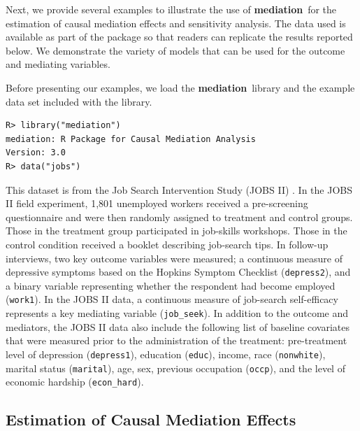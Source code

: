 \documentclass[11pt,letterpaper]{article}
\theoremstyle{plain}
\newcommand\bmediation{{\bf mediation}}
\begin{document}
Next, we provide several examples to illustrate the use of
\bmediation\ for the estimation of causal mediation effects and
sensitivity analysis.  The data used is available as part of the
package so that readers can replicate the results reported below.  We
demonstrate the variety of models that can be used for the outcome and
mediating variables.

Before presenting our examples, we load the \bmediation\ library and
the example data set included with the library.
\begin{verbatim}
R> library("mediation")
mediation: R Package for Causal Mediation Analysis
Version: 3.0
R> data("jobs")
\end{verbatim}
This dataset is from the Job Search Intervention Study (JOBS II)
\citep{Vinokur:1997}. In the JOBS II field experiment, 1,801
unemployed workers received a pre-screening questionnaire and were
then randomly assigned to treatment and control groups. Those in the
treatment group participated in job-skills workshops.  Those in the
control condition received a booklet describing job-search tips. In
follow-up interviews, two key outcome variables were measured; a
continuous measure of depressive symptoms based on the Hopkins Symptom
Checklist (\texttt{depress2}), and a binary variable representing
whether the respondent had become employed (\texttt{work1}). In the
JOBS II data, a continuous measure of job-search self-efficacy
represents a key mediating variable (\texttt{job\_seek}). In addition
to the outcome and mediators, the JOBS II data also include the
following list of baseline covariates that were measured prior to the
administration of the treatment: pre-treatment level of depression
(\texttt{depress1}), education (\texttt{educ}), income, race
(\texttt{nonwhite}), marital status (\texttt{marital}), age, sex,
previous occupation (\texttt{occp}), and the level of economic
hardship (\texttt{econ\_hard}).

\subsection{Estimation of Causal Mediation Effects}
\end{document}
